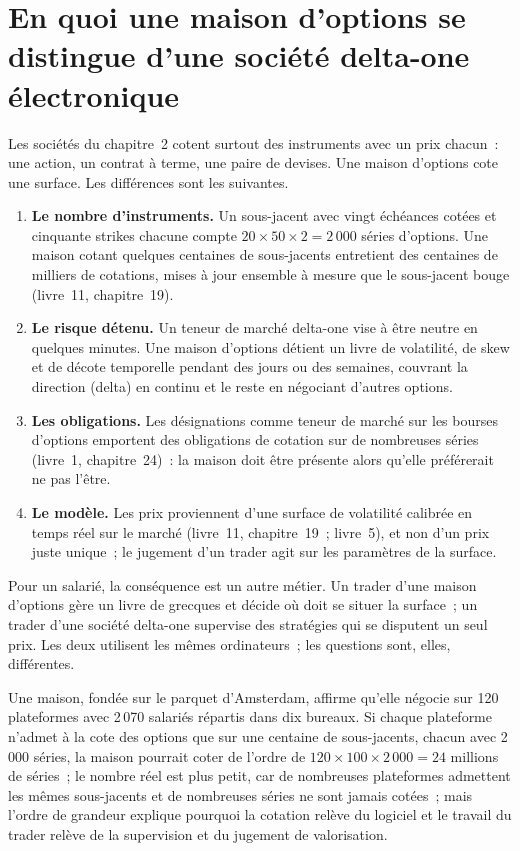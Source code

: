 \section{En quoi une maison d'options se distingue d'une société delta-one électronique}

Les sociétés du chapitre~2 cotent surtout des instruments avec un prix chacun~: une action, un contrat à terme, une paire de devises. Une maison d'options
cote une surface. Les différences sont les suivantes.

\begin{enumerate}
\item \textbf{Le nombre d'instruments.} Un sous-jacent avec vingt échéances cotées et cinquante strikes chacune compte
$20\times50\times2=2\,000$ séries d'options. Une maison cotant quelques centaines de sous-jacents entretient des centaines de milliers de
cotations, mises à jour ensemble à mesure que le sous-jacent bouge (livre~11, chapitre~19).
\item \textbf{Le risque détenu.} Un teneur de marché delta-one vise à être neutre en quelques minutes. Une maison d'options détient un livre de
volatilité, de skew et de décote temporelle pendant des jours ou des semaines, couvrant la direction (delta) en continu et le reste
en négociant d'autres options.
\item \textbf{Les obligations.} Les désignations comme teneur de marché sur les bourses d'options emportent des obligations de cotation sur de nombreuses
séries (livre~1, chapitre~24)~: la maison doit être présente alors qu'elle préférerait ne pas l'être.
\item \textbf{Le modèle.} Les prix proviennent d'une surface de volatilité calibrée en temps réel sur le marché (livre~11, chapitre~19~; livre~5),
et non d'un prix juste unique~; le jugement d'un trader agit sur les paramètres de la surface.
\end{enumerate}

Pour un salarié, la conséquence est un autre métier. Un trader d'une maison d'options gère un livre de grecques et décide
où doit se situer la surface~; un trader d'une société delta-one supervise des stratégies qui se disputent un seul prix.
Les deux utilisent les mêmes ordinateurs~; les questions sont, elles, différentes.

\begin{example}\label{ex:in:the-options-market-making-houses:scale}
Une maison, fondée sur le parquet d'Amsterdam, affirme qu'elle négocie sur 120 plateformes avec 2\,070 salariés répartis dans dix bureaux.
Si chaque plateforme n'admet à la cote des options que sur une centaine de sous-jacents, chacun avec 2\,000 séries, la maison pourrait coter de l'ordre de
$120\times100\times2\,000=24$ millions de séries~; le nombre réel est plus petit, car de nombreuses plateformes admettent les mêmes
sous-jacents et de nombreuses séries ne sont jamais cotées~; mais l'ordre de grandeur explique pourquoi la cotation relève du logiciel et
le travail du trader relève de la supervision et du jugement de valorisation.
\end{example}

